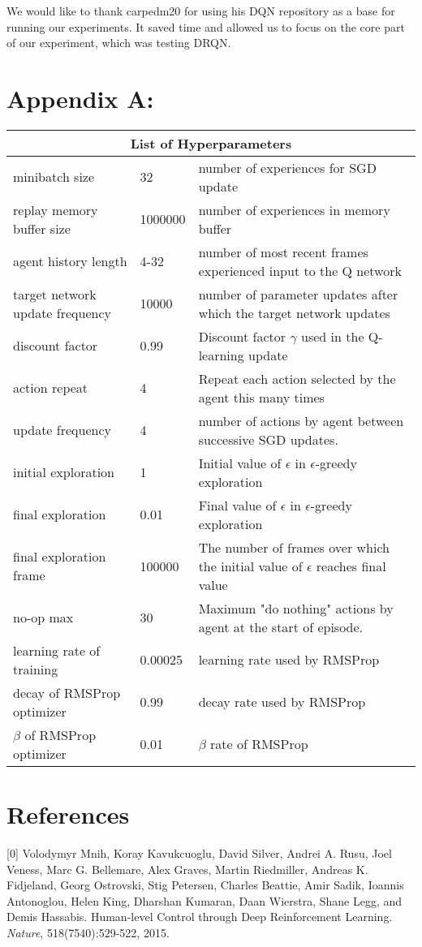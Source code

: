 \documentclass{article}
\begin{document}
We would like to thank carpedm20 for using his DQN repository as a base for
running our experiments. It saved time and allowed us to focus on the
core part of our experiment, which was testing DRQN.

\section*{Appendix A:}

\begin{tabular}{ |l|l|l| }
  \hline
  \multicolumn{3}{|c|}{List of Hyperparameters} \\
  \hline
  minibatch size & 32 & number of experiences for SGD update\\
  replay memory buffer size & 1000000 & number of experiences in memory buffer\\
  agent history length & 4-32 & number of most recent frames experienced input to the Q network\\
  target network update frequency & 10000 & number of parameter updates after which the target network updates\\
  discount factor & 0.99 & Discount factor $\gamma$ used in the Q-learning update\\
  action repeat & 4 & Repeat each action selected by the agent this many times\\
  update frequency & 4 & number of actions by agent between successive SGD updates. \\
  initial exploration & 1 & Initial value of $\epsilon$ in $\epsilon$-greedy exploration \\
  final exploration & 0.01 & Final value of $\epsilon$ in $\epsilon$-greedy exploration\\
  final exploration frame & 100000 & The number of frames over which the initial value of $\epsilon$ reaches final value\\
  no-op max & 30 & Maximum "do nothing" actions by agent at the start of episode.\\
  learning rate of training & 0.00025 & learning rate used by RMSProp\\
  decay of RMSProp optimizer & 0.99 & decay rate used by RMSProp\\
  $\beta$ of RMSProp optimizer & 0.01 & $\beta$ rate of RMSProp\\
  \hline
\end{tabular}

\section*{References}
\small
[0] Volodymyr Mnih, Koray Kavukcuoglu, David Silver, Andrei A. Rusu, Joel Veness, Marc G. Bellemare, Alex Graves, Martin Riedmiller, Andreas K. Fidjeland, Georg Ostrovski, Stig Petersen, Charles Beattie, Amir Sadik, Ioannis Antonoglou, Helen King, Dharshan Kumaran, Daan Wierstra, Shane Legg, and Demis Hassabis. Human-level Control through Deep Reinforcement Learning. {\it Nature}, 518(7540):529-522, 2015.
\end{document}
